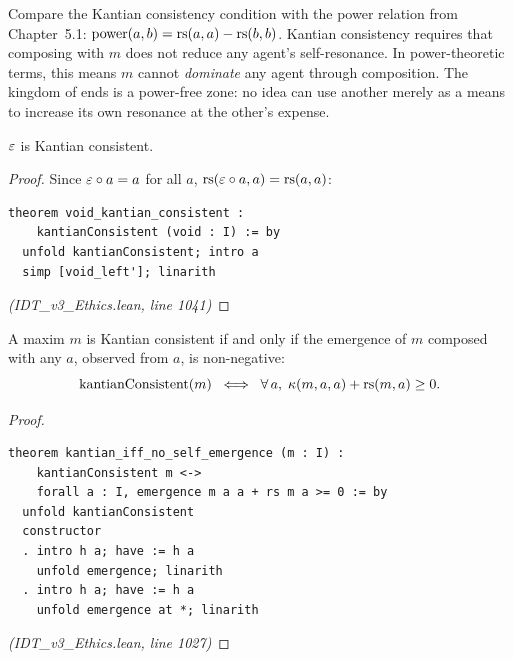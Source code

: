 \begin{remark}
Compare the Kantian consistency condition with the power relation from
Chapter~5.1: $\mathrm{power}(a,b) = \mathrm{rs}(a,a) - \mathrm{rs}(b,b)$. Kantian consistency
requires that composing with $m$ does not reduce any agent's self-resonance.
In power-theoretic terms, this means $m$ cannot \emph{dominate} any agent
through composition. The kingdom of ends is a power-free zone: no idea
can use another merely as a means to increase its own resonance at the
other's expense.
\end{remark}

\begin{theorem}
\label{thm:void-kantian}
$\varepsilon$ is Kantian consistent.
\end{theorem}

\begin{proof}
Since $\varepsilon \circ a = a$ for all $a$, $\mathrm{rs}(\varepsilon \circ a, a) = \mathrm{rs}(a,a)$:
\begin{lstlisting}
theorem void_kantian_consistent :
    kantianConsistent (void : I) := by
  unfold kantianConsistent; intro a
  simp [void_left']; linarith
\end{lstlisting}
\textit{(IDT\_v3\_Ethics.lean, line 1041)}
\end{proof}

\begin{theorem}
\label{thm:kantian-iff}
A maxim $m$ is Kantian consistent if and only if the emergence of $m$
composed with any $a$, observed from $a$, is non-negative:
\[
  \mathrm{kantianConsistent}(m) \;\iff\; \forall\, a,\; \kappa(m, a, a) + \mathrm{rs}(m, a) \geq 0.
\]
\end{theorem}

\begin{proof}
\begin{lstlisting}
theorem kantian_iff_no_self_emergence (m : I) :
    kantianConsistent m <->
    forall a : I, emergence m a a + rs m a >= 0 := by
  unfold kantianConsistent
  constructor
  . intro h a; have := h a
    unfold emergence; linarith
  . intro h a; have := h a
    unfold emergence at *; linarith
\end{lstlisting}
\textit{(IDT\_v3\_Ethics.lean, line 1027)}
\end{proof}

